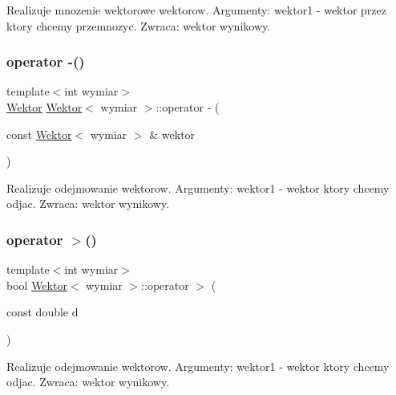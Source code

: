 Realizuje mnozenie wektorowe wektorow. Argumenty\+: wektor1 -\/ wektor przez ktory chcemy przemnozyc. Zwraca\+: wektor wynikowy. \mbox{\label{class_wektor_a07889863a7d2fe1b8ffe883bc6c9534f}} 
\subsubsection{\texorpdfstring{operator -\/()}{operator -()}}
{\footnotesize\ttfamily template$<$int wymiar$>$ \\
\mbox{\hyperlink{class_wektor}{Wektor}} \mbox{\hyperlink{class_wektor}{Wektor}}$<$ wymiar $>$\+::operator -\/ (\begin{DoxyParamCaption}\item[{const \mbox{\hyperlink{class_wektor}{Wektor}}$<$ wymiar $>$ \&}]{wektor }\end{DoxyParamCaption})\hspace{0.3cm}{\ttfamily [inline]}}

Realizuje odejmowanie wektorow. Argumenty\+: wektor1 -\/ wektor ktory chcemy odjac. Zwraca\+: wektor wynikowy. \mbox{\label{class_wektor_a01f7399a7fe76b11fcb76be76f06432a}} 
\subsubsection{\texorpdfstring{operator $>$()}{operator >()}}
{\footnotesize\ttfamily template$<$int wymiar$>$ \\
bool \mbox{\hyperlink{class_wektor}{Wektor}}$<$ wymiar $>$\+::operator $>$ (\begin{DoxyParamCaption}\item[{const double}]{d }\end{DoxyParamCaption})\hspace{0.3cm}{\ttfamily [inline]}}

Realizuje odejmowanie wektorow. Argumenty\+: wektor1 -\/ wektor ktory chcemy odjac. Zwraca\+: wektor wynikowy. \mbox{\label{class_wektor_aa7da735aa63205e853363b32dae520d7}} 
